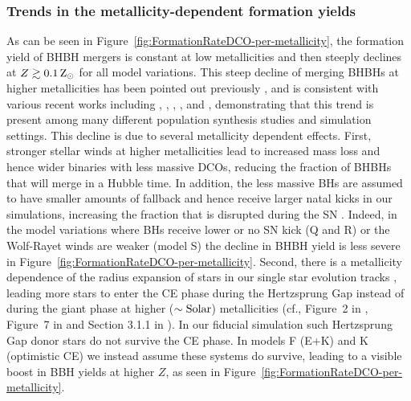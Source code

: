 \documentclass[fleqn,usenatbib]{mnras}
\newcommand{\Zi}{\ensuremath{Z}\xspace}
\newcommand{\Zsun}{\ensuremath{\,\rm{Z}_{\odot}}\xspace}
\begin{document}
\subsubsection{Trends in the metallicity-dependent formation yields}
%
As can be seen in Figure~\ref{fig:FormationRateDCO-per-metallicity}, the formation yield of \ac{BHBH} mergers is constant at low metallicities and then steeply declines at $\Zi \gtrsim 0.1 \Zsun$ for all model variations.  This steep decline of merging BHBHs at higher metallicities has been pointed out previously \citep[e.g.,][]{Belczynski:2010,2012ApJ...759...52D}, and is consistent with various recent works including  \citet{2018MNRAS.474.2959G}, \citet{GiacobboMapelli:2018}, \citet{2018A&A...619A..77K}, \citet{Chruslinska:2019obsSFRD}, \citet{Neijssel:2019} and \citet{Santoliquido:2021}, demonstrating that this trend is present among many different population synthesis studies and simulation settings. This decline is due to several metallicity dependent effects. First, stronger stellar winds at higher metallicities lead to increased mass loss and hence wider binaries with less massive \acp{DCO}, reducing the fraction of \acp{BHBH} that will merge in a Hubble time. In addition, the less massive \acp{BH} are assumed to have smaller amounts of fallback and hence receive larger natal kicks in our simulations, increasing the fraction that is disrupted during the \ac{SN} \citep[cf.,][]{2012ApJ...749...91F,2018A&A...619A..77K,2019A&A...624A..66R}.  Indeed, in the model variations where \acp{BH} receive lower or no \ac{SN} kick (Q and R) or the Wolf-Rayet winds are weaker (model S) the decline in \ac{BHBH} yield is less severe in Figure~\ref{fig:FormationRateDCO-per-metallicity}.  Second, there is a metallicity dependence of the radius expansion of stars in our single star evolution tracks \citep{2000MNRAS.315..543H}, leading more stars to enter the \ac{CE} phase during the Hertzsprung Gap instead of during the giant phase at higher ($\sim{\rm Solar}$) metallicities  (cf., Figure~2 in \citealt{Belczynski:2010}, Figure~7 in \citealt{Linden:2010} and Section 3.1.1 in \citealt{Bavera:2021}). In our fiducial simulation such Hertzsprung Gap donor stars do not survive the \ac{CE} phase. In models F (E+K) and K (optimistic CE) we instead assume these systems do survive, leading to a visible boost in BBH yields at higher $\Zi$, as seen in Figure~\ref{fig:FormationRateDCO-per-metallicity}. 
\end{document}
